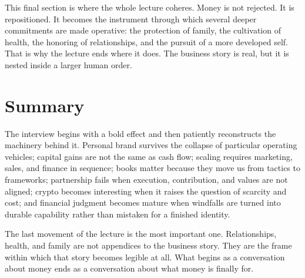 This final section is where the whole lecture coheres. Money is not rejected. It is repositioned. It becomes the instrument through which several deeper commitments are made operative: the protection of family, the cultivation of health, the honoring of relationships, and the pursuit of a more developed self. That is why the lecture ends where it does. The business story is real, but it is nested inside a larger human order.

\section{Summary}

The interview begins with a bold effect and then patiently reconstructs the machinery behind it. Personal brand survives the collapse of particular operating vehicles; capital gains are not the same as cash flow; scaling requires marketing, sales, and finance in sequence; books matter because they move us from tactics to frameworks; partnership fails when execution, contribution, and values are not aligned; crypto becomes interesting when it raises the question of scarcity and cost; and financial judgment becomes mature when windfalls are turned into durable capability rather than mistaken for a finished identity.

The last movement of the lecture is the most important one. Relationships, health, and family are not appendices to the business story. They are the frame within which that story becomes legible at all. What begins as a conversation about money ends as a conversation about what money is finally for.